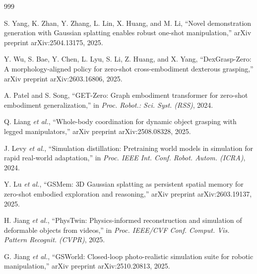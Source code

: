 \documentclass[12pt,a4paper,oneside]{report}
\begin{document}
\begin{thebibliography}{999}

S. Yang, K. Zhan, Y. Zhang, L. Lin, X. Huang, and M. Li, ``Novel demonstration generation with Gaussian splatting enables robust one-shot manipulation,'' arXiv preprint arXiv:2504.13175, 2025.




Y. Wu, S. Bae, Y. Chen, L. Lyu, S. Li, Z. Huang, and X. Yang, ``{DexGrasp-Zero}: A morphology-aligned policy for zero-shot cross-embodiment dexterous grasping,'' arXiv preprint arXiv:2603.16806, 2025.




A. Patel and S. Song, ``{GET-Zero}: Graph embodiment transformer for zero-shot embodiment generalization,'' in \textit{Proc. Robot.: Sci. Syst. (RSS)}, 2024.




Q. Liang \textit{et al.}, ``Whole-body coordination for dynamic object grasping with legged manipulators,'' arXiv preprint arXiv:2508.08328, 2025.




J. Levy \textit{et al.}, ``Simulation distillation: Pretraining world models in simulation for rapid real-world adaptation,'' in \textit{Proc. IEEE Int. Conf. Robot. Autom. (ICRA)}, 2024.




Y. Lu \textit{et al.}, ``{GSMem}: {3D} Gaussian splatting as persistent spatial memory for zero-shot embodied exploration and reasoning,'' arXiv preprint arXiv:2603.19137, 2025.




H. Jiang \textit{et al.}, ``PhysTwin: Physics-informed reconstruction and simulation of deformable objects from videos,'' in \textit{Proc. IEEE/CVF Conf. Comput. Vis. Pattern Recognit. (CVPR)}, 2025.




G. Jiang \textit{et al.}, ``{GSWorld}: Closed-loop photo-realistic simulation suite for robotic manipulation,'' arXiv preprint arXiv:2510.20813, 2025.




\end{thebibliography}
\end{document}
